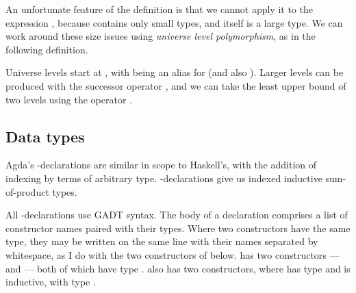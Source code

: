 
An unfortunate feature of the definition  is that we cannot
apply it to the expression , because 
contains only small types, and itself is a large type.
We can work around these size issues using \emph{universe level polymorphism},
as in the following definition.


Universe levels start at , with  being
an alias for \AgdaSpace{} (and also
).
Larger levels can be produced with the successor operator ,
and we can take the least upper bound of two levels using the operator
\AgdaPrimitive{\_$\sqcup$\_}.

\subsection{Data types}

Agda's -declarations are similar in scope to Haskell's, with
the addition of indexing by terms of arbitrary type.
-declarations give us indexed inductive sum-of-product types.

All -declarations use GADT syntax.
The body of a declaration comprises a list of constructor names paired with
their types.
Where two constructors have the same type, they may be written on the same line
with their names separated by whitespace, as I do with the two constructors of
 below.
 has two constructors ---  and
 --- both of which have type
.
 also has two constructors, where
 has type  and
 is inductive, with type
\AgdaSpace{}\AgdaKeyword{$\to$}\AgdaSpace{}%
.

\noindent
\begin{minipage}[t]{0.5\textwidth}
\end{minipage}
\begin{minipage}[t]{0.5\textwidth}
\end{minipage}

